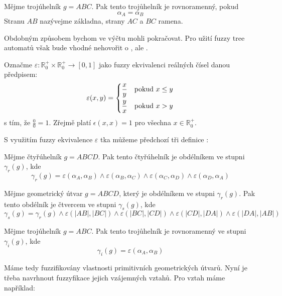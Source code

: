 \documentclass[a4paper,10pt]{article}
\begin{document}
\begin{definition}
  Mějme trojúhelník $g = A B C$. Pak tento trojůhelník je rovnoramenný, pokud
  $$
    \alpha_A = \alpha_B
  $$
  Stranu $AB$ nazývejme základna, strany $AC$ a $BC$ ramena.
\end{definition}

Obdobným způsobem bychom ve výčtu mohli pokračovat. Pro užití fuzzy tree automatů však bude vhodné nehovořit o , ale .

Označme $\varepsilon: \mathbb{R}_0^+ \times \mathbb{R}_0^+ \rightarrow [0,1]$ jako fuzzy ekvivalenci reálných čísel danou předpisem:
$$
  \varepsilon(x, y) =
    \begin{dcases}
     \frac{x}{y}	& \text{pokud $x \leq y$}	\\
     \frac{y}{x}	& \text{pokud $x > y$}
    \end{dcases}
$$
s tím, že $\frac{0}{0} = 1$. Zřejmě platí $\epsilon(x, x) = 1$ pro všechna $x \in \mathbb{R}_0^+$.

S využitím fuzzy ekvivalence $\varepsilon$ tka můžeme předchozí tři definice :

\begin{definition}
 Mějme čtyřúhelník $g = A B C D$. Pak tento čtyřúhelník je obdélníkem ve stupni $\gamma_r(g)$, kde
 $$
  \gamma_r(g) = \varepsilon(\alpha_A, \alpha_B) 
  \wedge \varepsilon(\alpha_B, \alpha_C)
  \wedge \varepsilon(\alpha_C, \alpha_D)
  \wedge \varepsilon(\alpha_D, \alpha_A)
 $$
\end{definition}

\begin{definition}
 Mějme geometrický útvar $g = A B C D$, který je obdélníkem ve stupni $\gamma_r(g)$. Pak tento obdélník je čtvercem ve stupni $\gamma_s(g)$, kde
 $$
 \gamma_s(g) = \gamma_r(g)
  \wedge \varepsilon(|A B|, |B C|) 
  \wedge \varepsilon(|B C|, |C D|)
  \wedge \varepsilon(|C D|, |D A|)
  \wedge \varepsilon(|D A|, |A B|)
 $$
\end{definition}

\begin{definition}
  Mějme trojúhelník $g = A B C$. Pak tento trojůhelník je rovnoramenný ve stupni $\gamma_i(g)$, kde
  $$
    \gamma_i(g) = \varepsilon(\alpha_A, \alpha_B)
  $$
\end{definition}

Máme tedy fuzzifikovány vlastnosti primitivních geometrických útvarů. Nyní je třeba navrhnout fuzzyfikace jejich vzájemných vztahů. Pro vztah  máme například:
\end{document}
